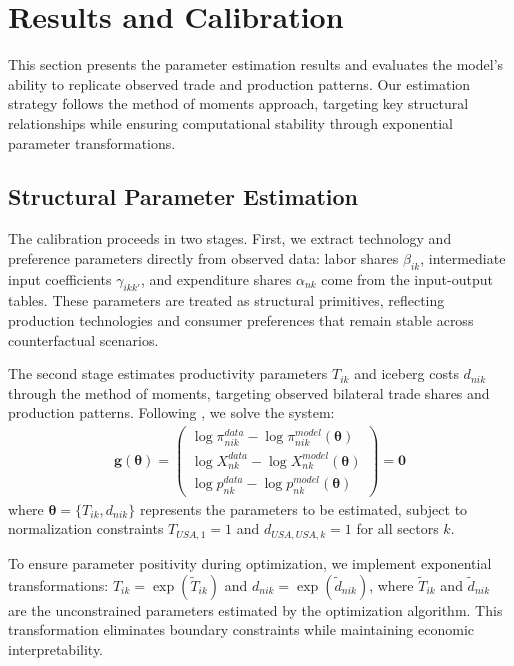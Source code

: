 \section{Results and Calibration}

This section presents the parameter estimation results and evaluates the model's ability to replicate observed trade and production patterns. Our estimation strategy follows the method of moments approach, targeting key structural relationships while ensuring computational stability through exponential parameter transformations.

\subsection{Structural Parameter Estimation}

The calibration proceeds in two stages. First, we extract technology and preference parameters directly from observed data: labor shares $\beta_{ik}$, intermediate input coefficients $\gamma_{ikk'}$, and expenditure shares $\alpha_{nk}$ come from the input-output tables. These parameters are treated as structural primitives, reflecting production technologies and consumer preferences that remain stable across counterfactual scenarios.

The second stage estimates productivity parameters $T_{ik}$ and iceberg costs $d_{nik}$ through the method of moments, targeting observed bilateral trade shares and production patterns. Following \cite{cdk2012}, we solve the system:
\begin{align}
\mathbf{g}(\boldsymbol{\theta}) = \begin{pmatrix}
\log \pi_{nik}^{data} - \log \pi_{nik}^{model}(\boldsymbol{\theta}) \\
\log X_{nk}^{data} - \log X_{nk}^{model}(\boldsymbol{\theta}) \\
\log p_{nk}^{data} - \log p_{nk}^{model}(\boldsymbol{\theta})
\end{pmatrix} = \mathbf{0}
\end{align}
where $\boldsymbol{\theta} = \{T_{ik}, d_{nik}\}$ represents the parameters to be estimated, subject to normalization constraints $T_{USA,1} = 1$ and $d_{USA,USA,k} = 1$ for all sectors $k$.

To ensure parameter positivity during optimization, we implement exponential transformations: $T_{ik} = \exp(\tilde{T}_{ik})$ and $d_{nik} = \exp(\tilde{d}_{nik})$, where $\tilde{T}_{ik}$ and $\tilde{d}_{nik}$ are the unconstrained parameters estimated by the optimization algorithm. This transformation eliminates boundary constraints while maintaining economic interpretability.


